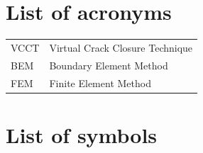 \documentclass[a4paper]{jpconf}
\begin{document}
\section*{List of acronyms}

\begin{tabular}{ll}
VCCT &  Virtual Crack Closure Technique\\
BEM &  Boundary Element Method\\
FEM &  Finite Element Method\\
\end{tabular}


\section*{List of symbols}
\end{document}
